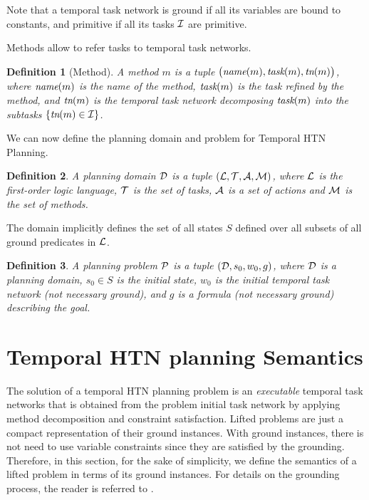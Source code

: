 \documentclass[letterpaper]{article} %
\newtheorem{definition}{Definition}
\newcommand{\name}{\text{\it name}}
\newcommand{\task}{\text{\it task}}
\newcommand{\tn}{\text{\it tn}}
\begin{document}
Note that a temporal task network is ground if all its variables are bound to constants, and primitive if all its tasks ${\cal{I}}$ are primitive.

Methods allow to refer tasks to temporal task networks.
\begin{definition}[Method]
A {\em method} $m$ is a tuple $\bigl(\name(m), \task(m), \tn(m)\bigr)$, where $\name(m)$ is the name of the method, $\task(m)$ is the task refined by the method, and $\tn(m)$ is the temporal task network decomposing $\task(m)$ into the subtasks $\{\tn(m) \in \cal{I}\}$.
\end{definition}
 We can now define the planning domain and problem for Temporal HTN Planning.
\begin{definition}
 A {\em planning domain} $\cal{D}$ is a tuple $({\cal{L}}, {\cal{T}}, {\cal{A}}, {\cal{M}})$, where $\cal{L}$ is the first-order logic language, $\cal{T}$ is the set of tasks, ${\cal{A}}$ is a set of actions and $\cal{M}$ is the set of methods. %
 \end{definition}

 The domain implicitly defines the set of all states $S$ defined over all subsets of all ground predicates in $\cal{L}$.

 \begin{definition}
 A {\em planning problem} $\cal{P}$ is a tuple $({\cal{D}}, {s_0}, w_0, g)$, where $\cal{D}$ is a planning domain, $s_0 \in S$ is the initial state, $w_0$ is the initial temporal task network (not necessary ground), and $g$ is a formula (not necessary ground) describing the goal.
 \end{definition}

 \section{Temporal HTN planning Semantics}
 \label{THTN}

 The solution of a temporal HTN planning problem is an {\it executable} temporal task networks that is obtained from the problem initial task network by applying method decomposition and constraint satisfaction. Lifted problems are just a compact representation of their ground instances. With ground instances, there is not need to use variable constraints since they are satisfied by the grounding. Therefore, in this section, for the sake of simplicity, we define the semantics of a lifted problem in terms of its ground instances. For details on the grounding process, the reader is referred to \cite{behnke20,ramoul17}.
\end{document}
